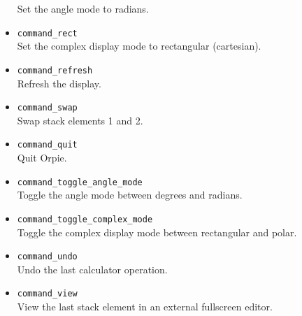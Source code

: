 \documentclass[11pt,notitlepage]{article}
\begin{document}
\begin{itemize}
      Set the angle mode to radians.
   \item {\tt command\_rect} \\
      Set the complex display mode to rectangular (cartesian).
   \item {\tt command\_refresh} \\
      Refresh the display.
   \item {\tt command\_swap} \\
      Swap stack elements 1 and 2.
   \item {\tt command\_quit} \\
      Quit Orpie.
   \item {\tt command\_toggle\_angle\_mode} \\
      Toggle the angle mode between degrees and radians.
   \item {\tt command\_toggle\_complex\_mode} \\
      Toggle the complex display mode between rectangular and polar.
   \item {\tt command\_undo} \\
      Undo the last calculator operation.
   \item {\tt command\_view} \\
      View the last stack element in an external fullscreen editor.
\end{itemize}
\end{document}
